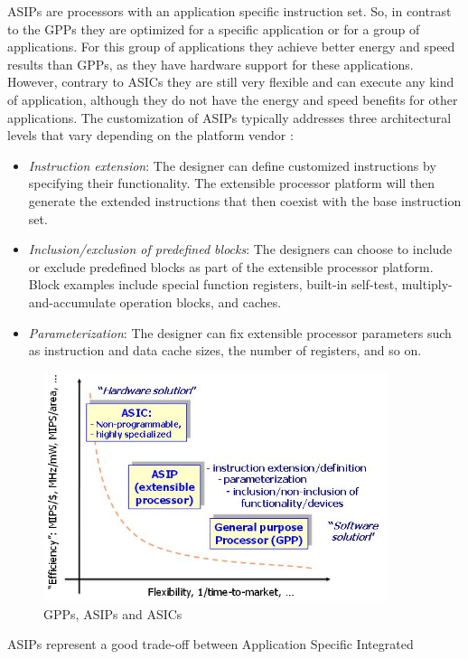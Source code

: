 ASIPs are processors with an application specific instruction set. So,
in contrast to the GPPs they are optimized for a specific application or
for a group of applications. For this group of applications they achieve
better energy and speed results than GPPs, as they have hardware support
for these applications. However, contrary to ASICs they are still very
flexible and can execute any kind of application, although they do not
have the energy and speed benefits for other applications. The
customization of ASIPs typically addresses three architectural levels
that vary depending on the platform vendor \cite{Henkel03}:
\begin{itemize}
\item
  \emph{Instruction extension}: The designer can define customized
  instructions by specifying their functionality. The extensible
  processor platform will then generate the extended instructions that
  then coexist with the base instruction set.
\item
  \emph{Inclusion/exclusion of predefined blocks}: The designers can
  choose to include or exclude predefined blocks as part of the
  extensible processor platform. Block examples include special function
  registers, built-in self-test, multiply-and-accumulate operation
  blocks, and caches.
\item
  \emph{Parameterization}: The designer can fix extensible processor
  parameters such as instruction and data cache sizes, the number of
  registers, and so on.
\end{itemize}
\begin{figure}[!htb]
	\centering
	\includegraphics[width=0.9\textwidth]{src/images/1-1.png}
	\caption{ GPPs, ASIPs and ASICs \cite{Henkel06}}
	\label{fig:fig11}
\end{figure}
ASIPs represent a good trade-off between Application Specific Integrated
